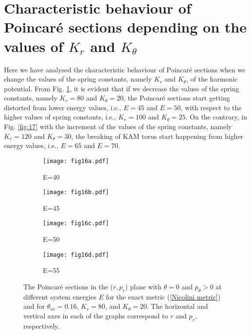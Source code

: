 \documentclass[aps,prd,showpacs,nofootinbib,floats,floatfix,preprintnumbers,groupedaddress,twocolumn]{revtex4-1}
\begin{document}
\section{{\label{App3}}Characteristic behaviour of Poincar\'e sections depending on the values of $K_r$ and $K_{\theta}$}
%
%
%
%
\par\noindent
Here we have analysed the characteristic behaviour of Poincar\'e sections when we change the values of the spring constants, namely $K_{r}$ and $K_{\theta}$, of the harmonic potential. From Fig. \ref{fig:16}, it is evident that if we decrease the values of the spring constants, namely $K_{r}=80$ and $K_{\theta}=20$,  the Poincar\'e sections start getting distorted from  lower energy values, i.e., $E=45$ and $E=50$, with respect to the higher values of spring constants, i.e., $K_{r}=100$ and $K_{\theta}=25$. On the contrary, in Fig. \ref{fig:17} with the increment of the values of the spring constants, namely $K_{r}=120$ and $K_{\theta}=30$, the breaking of KAM torus start happening from higher energy values, i.e., $E=65$ and $E=70$.  
%
%
%
%
\begin{figure}[H]
	\centering
	\begin{subfigure}[b]{0.49\linewidth}
		\texttt{[image: fig16a.pdf]}
		\caption{E=40}
	\end{subfigure}
	\begin{subfigure}[b]{0.49\linewidth}
		\texttt{[image: fig16b.pdf]}
		\caption{E=45}
	\end{subfigure}
	\begin{subfigure}[b]{0.49\linewidth}
		\texttt{[image: fig16c.pdf]}
		\caption{E=50}
	\end{subfigure}
	\begin{subfigure}[b]{0.49\linewidth}
		\texttt{[image: fig16d.pdf]}
		\caption{E=55}
	\end{subfigure}
	\caption{The Poincar\'e sections in the ($r,p_r$) plane with $\theta = 0$ and $p_\theta > 0$ at different system energies $E$ for the exact metric (\ref{Nicolini metric}) and for $\theta_{nc}=0.16$, $K_{r}=80$, and  $K_{\theta}=20$. The horizontal and vertical axes in each of the graphs correspond to $r$ and $p_r$, respectively.}
	\label{fig:16}
\end{figure}
%
%
%
%
\end{document}
